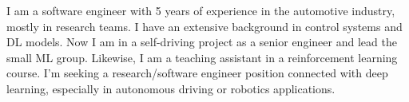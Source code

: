 I am a software engineer with 5 years of experience in the automotive industry,
mostly in research teams. I have an extensive background in control
systems and DL models. Now I am in a self-driving project as a
senior engineer and lead the small ML group. Likewise, I am a teaching assistant
in a reinforcement learning course. I'm seeking a research/software engineer
position connected with deep learning, especially in autonomous driving or
robotics applications.